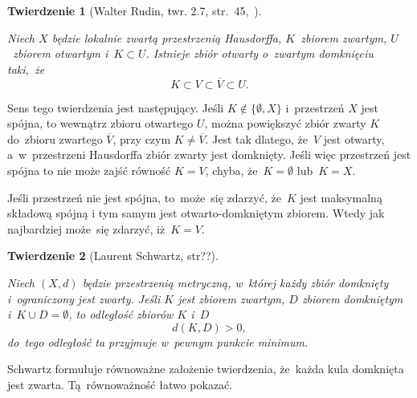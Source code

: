 \documentclass[a4paper,11pt]{article}
\numberwithin{equation}{section}
\newtheorem{theorem}{Twierdzenie}
\begin{document}
\begin{theorem}[Walter Rudin, twr. 2.7,
  str.~45,~\cite{RudinAnalizaRzeczywistaIZespolona1998}]
  \label{thm:Zemanian-01}

  Niech $X$ będzie lokalnie zwartą przestrzenią Hausdorffa,
  $K$~zbiorem zwartym, $U$~zbiorem otwartym i~$K \subset U$. Istnieje
  zbiór otwarty o~zwartym domknięciu taki,~że
  \begin{equation}
    \label{eq:Zemanian-04}
    K \subset V \subset \overline{ V } \subset U.
  \end{equation}

\end{theorem}





Sens tego twierdzenia jest następujący. Jeśli $K \notin \{ \emptyset, X \}$
i~przestrzeń $X$ jest spójna, to wewnątrz zbioru otwartego $U$, można
powiększyć zbiór zwarty $K$ do~zbioru zwartego $\overline{ V }$, przy czym
$K \neq \overline{ V }$. Jest tak dlatego, że~$V$ jest otwarty,
a~w~przestrzeni Hausdorffa zbiór zwarty jest domknięty. Jeśli więc
przestrzeń jest spójna to nie może zajść równość $K = V$, chyba,
że~$K = \emptyset$ lub~$K = X$.

Jeśli przestrzeń nie jest spójna, to~może~się zdarzyć, że~$K$ jest
maksymalną składową spójną i tym samym jest otwarto-domkniętym
zbiorem. Wtedy jak najbardziej może~się zdarzyć, iż~$K = V$.





\begin{theorem}[Laurent Schwartz,
  str??\cite{SchwartzKursAnalizyMatematycznejVolI1979}]
  \label{thm:Zemanian-02}

  Niech $( X, d )$ będzie przestrzenią metryczną, w~której każdy zbiór
  domknięty i~ograniczony jest zwarty. Jeśli $K$ jest zbiorem zwartym,
  $D$ zbiorem domkniętym i~$K \cup D = \emptyset$, to odległość zbiorów $K$
  i~$D$
  \begin{equation}
    \label{eq:Zem-s01-05}
    d( K, D ) > 0,
  \end{equation}
  do~tego odległość ta przyjmuje w~pewnym punkcie minimum.

\end{theorem}





\noindent
Schwartz formułuje równoważne założenie twierdzenia, że~każda
kula domknięta jest zwarta. Tą~równoważność łatwo pokazać.
\end{document}
